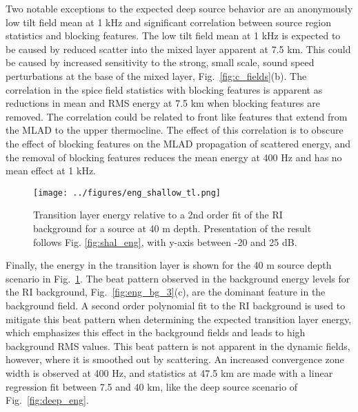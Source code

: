 \documentclass[preprint,NumberedRefs]{JASA}
\begin{document}
Two notable exceptions to the expected deep source behavior are an anonymously low tilt field mean at 1 kHz and significant correlation between source region statistics and blocking features. The low tilt field mean at 1 kHz is expected to be caused by reduced scatter into the mixed layer apparent at 7.5 km. This could be caused by increased sensitivity to the strong, small scale, sound speed perturbations at the base of the mixed layer, Fig.~\ref{fig:c_fields}(b). The correlation in the spice field statistics with blocking features is apparent as reductions in mean and RMS energy at 7.5 km when blocking features are removed. The correlation could be related to front like features that extend from the MLAD to the upper thermocline. The effect of this correlation is to obscure the effect of blocking features on the MLAD propagation of scattered energy, and the removal of blocking features reduces the mean energy at 400 Hz and has no mean effect at 1 kHz.

\begin{figure}
\texttt{[image: ../figures/eng\_shallow\_tl.png]}
        \caption{Transition layer energy relative to a 2nd order fit of the RI background for a source at 40 m depth. Presentation of the result follows Fig. \ref{fig:shal_eng}, with y-axis between -20 and 25 dB.}
    \label{fig:eng_tl}
\end{figure}
Finally, the energy in the transition layer is shown for the 40 m source depth scenario in Fig.~\ref{fig:eng_tl}. The beat pattern observed in the background energy levels for the RI background, Fig.~\ref{fig:eng_bg_3}(c), are the dominant feature in the background field. A second order polynomial fit to the RI background is used to mitigate this beat pattern when determining the expected transition layer energy, which emphasizes this effect in the background fields and leads to high background RMS values. This beat pattern is not apparent in the dynamic fields, however, where it is smoothed out by scattering. An increased convergence zone width is observed at 400 Hz, and statistics at 47.5 km are made with a linear regression fit between 7.5 and 40 km, like the deep source scenario of Fig.~\ref{fig:deep_eng}.
\end{document}
